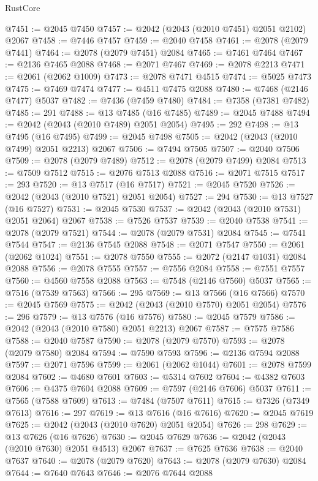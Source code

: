 \begin{lexlean}{RustCore}
\begin{coremodule}
@7451 := @2045 @7450
@7457 := @2042 (@2043 (@2010 @7451) @2051 @2102) @2067
@7458 := @7446 @7457
@7459 := @2040 @7458
@7461 := @2078 (@2079 @7441)
@7464 := @2078 (@2079 @7451) @2084
@7465 := @7461 @7464
@7467 := @2136 @7465 @2088
@7468 := @2071 @7467
@7469 := @2078 @2213
@7471 := @2061 (@2062 @1009)
@7473 := @2078 @7471 @4515
@7474 := @5025 @7473
@7475 := @7469 @7474
@7477 := @4511 @7475 @2088
@7480 := @7468 (@2146 @7477) @5037
@7482 := @7436 (@7459 @7480)
@7484 := @7358 (@7381 @7482)
@7485 := 291
@7488 := @13 @7485 (@16 @7485)
@7489 := @2045 @7488
@7494 := @2042 (@2043 (@2010 @7489) @2051 @2054)
@7495 := 292
@7498 := @13 @7495 (@16 @7495)
@7499 := @2045 @7498
@7505 := @2042 (@2043 (@2010 @7499) @2051 @2213) @2067
@7506 := @7494 @7505
@7507 := @2040 @7506
@7509 := @2078 (@2079 @7489)
@7512 := @2078 (@2079 @7499) @2084
@7513 := @7509 @7512
@7515 := @2076 @7513 @2088
@7516 := @2071 @7515
@7517 := 293
@7520 := @13 @7517 (@16 @7517)
@7521 := @2045 @7520
@7526 := @2042 (@2043 (@2010 @7521) @2051 @2054)
@7527 := 294
@7530 := @13 @7527 (@16 @7527)
@7531 := @2045 @7530
@7537 := @2042 (@2043 (@2010 @7531) @2051 @2064) @2067
@7538 := @7526 @7537
@7539 := @2040 @7538
@7541 := @2078 (@2079 @7521)
@7544 := @2078 (@2079 @7531) @2084
@7545 := @7541 @7544
@7547 := @2136 @7545 @2088
@7548 := @2071 @7547
@7550 := @2061 (@2062 @1024)
@7551 := @2078 @7550
@7555 := @2072 (@2147 @1031) @2084 @2088
@7556 := @2078 @7555
@7557 := @7556 @2084
@7558 := @7551 @7557
@7560 := @4560 @7558 @2088
@7563 := @7548 (@2146 @7560) @5037
@7565 := @7516 (@7539 @7563)
@7566 := 295
@7569 := @13 @7566 (@16 @7566)
@7570 := @2045 @7569
@7575 := @2042 (@2043 (@2010 @7570) @2051 @2054)
@7576 := 296
@7579 := @13 @7576 (@16 @7576)
@7580 := @2045 @7579
@7586 := @2042 (@2043 (@2010 @7580) @2051 @2213) @2067
@7587 := @7575 @7586
@7588 := @2040 @7587
@7590 := @2078 (@2079 @7570)
@7593 := @2078 (@2079 @7580) @2084
@7594 := @7590 @7593
@7596 := @2136 @7594 @2088
@7597 := @2071 @7596
@7599 := @2061 (@2062 @1044)
@7601 := @2078 @7599 @2084
@7602 := @4680 @7601
@7603 := @5314 @7602
@7604 := @4382 @7603
@7606 := @4375 @7604 @2088
@7609 := @7597 (@2146 @7606) @5037
@7611 := @7565 (@7588 @7609)
@7613 := @7484 (@7507 @7611)
@7615 := @7326 (@7349 @7613)
@7616 := 297
@7619 := @13 @7616 (@16 @7616)
@7620 := @2045 @7619
@7625 := @2042 (@2043 (@2010 @7620) @2051 @2054)
@7626 := 298
@7629 := @13 @7626 (@16 @7626)
@7630 := @2045 @7629
@7636 := @2042 (@2043 (@2010 @7630) @2051 @4513) @2067
@7637 := @7625 @7636
@7638 := @2040 @7637
@7640 := @2078 (@2079 @7620)
@7643 := @2078 (@2079 @7630) @2084
@7644 := @7640 @7643
@7646 := @2076 @7644 @2088

\end{coremodule}
\end{lexlean}
